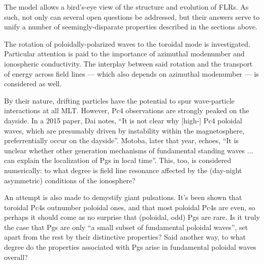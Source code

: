 The model allows a bird's-eye view of the structure and evolution of FLRs. As
such, not only can several open questions be addressed, but their answers serve
to unify a number of seemingly-disparate properties described in the sections
above. 

The rotation of poloidally-polarized waves to the toroidal mode is
investigated. Particular attention is paid to the importance of azimuthal
modenumber and ionospheric conductivity. The interplay between said rotation
and the transport of energy across field lines --- which also depends on
azimuthal modenumber --- is considered as well. 

By their nature, drifting particles have the potential to spur wave-particle
interactions at all MLT. However, Pc4 observations are strongly peaked on the
dayside. In a 2015 paper, Dai notes, ``It is not clear why
[high-\azm] Pc4 poloidal waves, which are presumably driven by instability
within the magnetosphere, preferrentially occur on the
dayside''\cite{dai_2015}. Motoba, later that year, echoes, ``It is unclear
whether other generation mechanisms of fundamental standing waves ... can
explain the localization of Pgs in local time''\cite{motoba_2015}. This, too,
is considered numerically: to what degree is field line resonance affected by
the (day-night asymmetric) conditions of the ionosphere? 

An attempt is also made to demystify giant pulsations. It's been shown that
toroidal Pc4s outnumber poloidal ones, and that most poloidal Pc4s are even, so
perhaps it should come as no surprise that (poloidal, odd) Pgs are rare. Is it
truly the case that Pgs are only ``a small subset of fundamental poloidal
waves''\cite{takahashi_2013}, set apart from the rest by their distinctive
properties? Said another way, to what degree do the properties
associated with Pgs arise in fundamental poloidal waves overall? 




